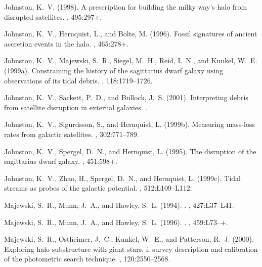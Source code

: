 \begin{thebibliography}{}
{Johnston}, K.~V. (1998).
\newblock A prescription for building the milky way's halo from disrupted
  satellites.
\newblock {\em \apj}, 495:297+.

{Johnston}, K.~V., {Hernquist}, L., and {Bolte}, M. (1996).
\newblock Fossil signatures of ancient accretion events in the halo.
\newblock {\em \apj}, 465:278+.

{Johnston}, K.~V., {Majewski}, S.~R., {Siegel}, M.~H., {Reid}, I.~N., and
  {Kunkel}, W.~E. (1999a).
\newblock Constraining the history of the sagittarius dwarf galaxy using
  observations of its tidal debris.
\newblock {\em \aj}, 118:1719--1726.

{Johnston}, K.~V., {Sackett}, P.~D., and {Bullock}, J.~S. (2001).
\newblock Interpreting debris from satellite disruption in external galaxies.
.

{Johnston}, K.~V., {Sigurdsson}, S., and {Hernquist}, L. (1999b).
\newblock Measuring mass-loss rates from galactic satellites.
\newblock {\em \mnras}, 302:771--789.

{Johnston}, K.~V., {Spergel}, D.~N., and {Hernquist}, L. (1995).
\newblock The disruption of the sagittarius dwarf galaxy.
\newblock {\em \apj}, 451:598+.

{Johnston}, K.~V., {Zhao}, H., {Spergel}, D.~N., and {Hernquist}, L. (1999c).
\newblock Tidal streams as probes of the galactic potential.
\newblock {\em \apjl}, 512:L109--L112.

{Majewski}, S.~R., {Munn}, J.~A., and {Hawley}, S.~L. (1994).
.
\newblock {\em \apjl}, 427:L37--L41.

{Majewski}, S.~R., {Munn}, J.~A., and {Hawley}, S.~L. (1996).
.
\newblock {\em \apjl}, 459:L73--+.

{Majewski}, S.~R., {Ostheimer}, J.~C., {Kunkel}, W.~E., and {Patterson}, R.~J.
  (2000).
\newblock Exploring halo substructure with giant stars. i. survey description
  and calibration of the photometric search technique.
\newblock {\em \aj}, 120:2550--2568.


\end{thebibliography}
